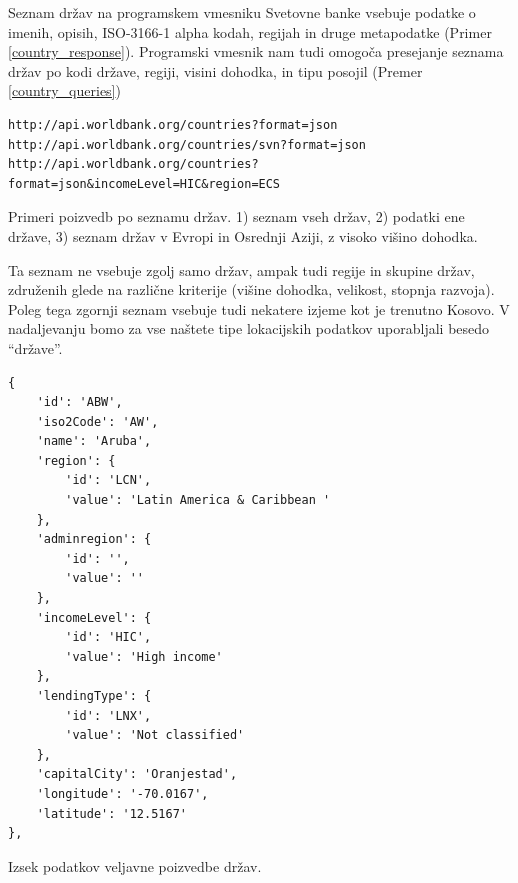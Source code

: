 Seznam držav na programskem vmesniku Svetovne banke vsebuje podatke o imenih, 
opisih, ISO-3166-1 alpha kodah, regijah in druge metapodatke 
(Primer \ref{country_response}). Programski
vmesnik nam tudi omogoča presejanje seznama držav po kodi države, regiji,
visini dohodka, in tipu posojil (Premer \ref{country_queries})


\begin{snippet}
\begin{center}
\begin{lstlisting}
http://api.worldbank.org/countries?format=json
http://api.worldbank.org/countries/svn?format=json
http://api.worldbank.org/countries?format=json&incomeLevel=HIC&region=ECS
\end{lstlisting}
\end{center}
\caption{Primeri poizvedb po seznamu držav.
1) seznam vseh držav, 2) podatki ene države,
3) seznam držav v Evropi in Osrednji Aziji, z visoko višino dohodka.}
\label{country_queries}
\end{snippet} 

Ta seznam ne vsebuje zgolj samo držav, ampak tudi regije in skupine držav, 
združenih glede na različne kriterije (višine dohodka, velikost, stopnja
razvoja). Poleg tega zgornji seznam vsebuje tudi nekatere izjeme kot je trenutno
Kosovo. V nadaljevanju bomo za vse naštete tipe lokacijskih podatkov
uporabljali besedo ``države''. 

\begin{snippet}
\begin{center}
\begin{lstlisting}
{
    'id': 'ABW',
    'iso2Code': 'AW',
    'name': 'Aruba',
    'region': {
        'id': 'LCN',
        'value': 'Latin America & Caribbean '
    },
    'adminregion': {
        'id': '',
        'value': ''
    },
    'incomeLevel': {
        'id': 'HIC',
        'value': 'High income'
    },
    'lendingType': {
        'id': 'LNX',
        'value': 'Not classified'
    },
    'capitalCity': 'Oranjestad',
    'longitude': '-70.0167',
    'latitude': '12.5167'
},
\end{lstlisting}
\end{center}
\caption[some]{Izsek podatkov veljavne poizvedbe držav.}
\label{country_response}
\end{snippet} 


